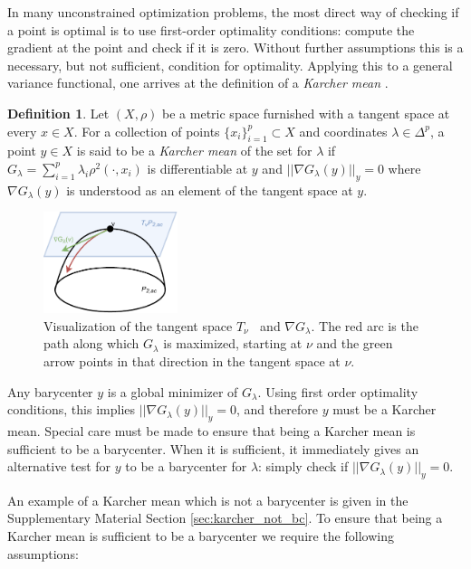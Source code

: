 \documentclass[nohyperref]{article}
\DeclareMathOperator{\Pac}{\mathcal{P}_{2,ac}(\mathbb{R}^d)}
\theoremstyle{definition}
\newtheorem{definition}{Definition}
\begin{document}
In many unconstrained optimization problems, the most direct way of checking if a point is optimal is to use first-order optimality conditions: compute the gradient at the point and check if it is zero. Without further assumptions this is a necessary, but not sufficient, condition for optimality. Applying this to a general variance functional, one arrives at the definition of a \emph{Karcher mean} \citep{karcher1977riemannian}.
\begin{definition}
    Let $(X,\rho)$ be a metric space furnished with a tangent space at every $x \in X$. For a collection of points $\{x_i\}_{i=1}^p \subset X$ and coordinates $\lambda \in \Delta^p$, a point $y\in X$ is said to be a \emph{Karcher mean} of the set for $\lambda$ if $G_{\lambda} = \sum_{i=1}^p \lambda_i \rho^2(\cdot, x_i)$ is differentiable at $y$ and $||\nabla G_{\lambda}(y)||_y = 0$ where $\nabla G_{\lambda}(y)$ is understood as an element of the tangent space at $y$.
\end{definition}

\begin{figure}
    \centering
    \includegraphics[width=0.35\textwidth]{figures/tangent_space.pdf}
    \caption{Visualization of the tangent space $T_{\nu}\Pac$ and $\nabla G_{\lambda}$. The red arc is the path along which $G_{\lambda}$ is maximized, starting at $\nu$ and the green arrow points in that direction in the tangent space at $\nu$.}
    \label{fig:tangent_space}
\end{figure}

Any barycenter $y$ is a global minimizer of $G_{\lambda}$. Using first order optimality conditions, this implies $||\nabla G_{\lambda}(y)||_y = 0$, and therefore $y$ must be a Karcher mean. Special care must be made to ensure that being a Karcher mean is sufficient to be a barycenter. When it is sufficient, it immediately gives an alternative test for $y$ to be a barycenter for $\lambda$: simply check if $||\nabla G_{\lambda}(y)||_y = 0$.

An example of a Karcher mean which is not a barycenter is given in the Supplementary Material Section \ref{sec:karcher_not_bc}. To ensure that being a Karcher mean is sufficient to be a barycenter we require the following assumptions:
\end{document}
